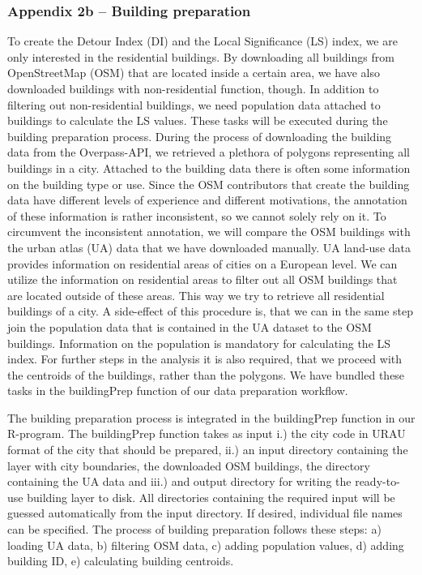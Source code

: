 \documentclass[10pt]{article}
\begin{document}
\subsubsection{Appendix 2b – Building preparation}
To create the Detour Index (DI) and the Local Significance (LS) index, we are only interested in the residential buildings.
By downloading all buildings from OpenStreetMap (OSM) that are located inside a certain area, we have also downloaded buildings with non-residential function, though.
In addition to filtering out non-residential buildings, we need population data attached to buildings to calculate the LS values.
These tasks will be executed during the building preparation process.
During the process of downloading the building data from the Overpass-API, we retrieved a plethora of polygons representing all buildings in a city.
Attached to the building data there is often some information on the building type or use. 
Since the OSM contributors that create the building data have different levels of experience and different motivations, the annotation of these information is rather inconsistent, so we cannot solely rely on it.
To circumvent the inconsistent annotation, we will compare the OSM buildings with the urban atlas (UA) data that we have downloaded manually.
UA land-use data provides information on residential areas of cities on a European level.
We can utilize the information on residential areas to filter out all OSM buildings that are located outside of these areas.
This way we try to retrieve all residential buildings of a city.
A side-effect of this procedure is, that we can in the same step join the population data that is contained in the UA dataset to the OSM buildings.
Information on the population is mandatory for calculating the LS index.   
For further steps in the analysis it is also required, that we proceed with the centroids of the buildings, rather than the polygons.
We have bundled these tasks in the buildingPrep function of our data preparation workflow.

The building preparation process is integrated in the buildingPrep function in our R-program.
The buildingPrep function takes as input i.) the city code in URAU format of the city that should be prepared, ii.) an input directory containing the layer with city boundaries, the downloaded OSM buildings, the directory containing the UA data and iii.) and output directory for writing the ready-to-use building layer to disk.
All directories containing the required input will be guessed automatically from the input directory.
If desired, individual file names can be specified.
The process of building preparation follows these steps: a) loading UA data, b) filtering OSM data, c) adding population values, d) adding building ID, e) calculating building centroids.
\end{document}

